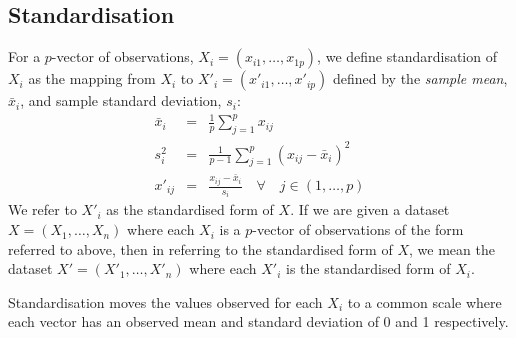 \documentclass[12pt]{article} %
\begin{document}
\subsection{Standardisation} \label{sec:standardisation}
For a $p$-vector of observations, $X_i=(x_{i1},\ldots,x_{1p})$, we define standardisation of $X_i$ as the mapping from $X_i$ to $X'_i=(x'_{i1},\ldots,x'_{ip})$ defined by the \emph{sample mean}, $\bar{x}_i$, and sample standard deviation, $s_i$:
\begin{eqnarray} \label{eqn:standardisation}
\bar{x}_i &=& \frac{1}{p}\sum_{j=1}^p x_{ij} \\
s_i^2 &=& \frac{1}{p - 1}\sum_{j=1}^p \left( x_{ij} - \bar{x}_i \right) ^2 \\
x'_{ij} &=& \frac{x_{ij}- \bar{x}_i}{s_i} \quad \forall \quad j \in (1,\ldots,p)
\end{eqnarray}
We refer to $X'_i$ as the standardised form of $X$. If we are given a dataset $X=(X_1,\ldots,X_n)$ where each $X_i$ is a $p$-vector of observations of the form referred to above, then in referring to the standardised form of $X$, we mean the dataset $X'=(X'_1,\ldots,X'_n)$ where each $X'_i$ is the standardised form of $X_i$.

Standardisation moves the values observed for each $X_i$ to a common scale where each vector has an observed mean and standard deviation of 0 and 1 respectively.
\end{document}
